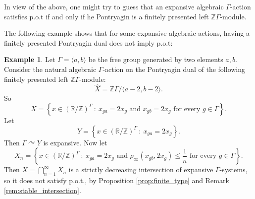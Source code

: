 \documentclass[oneside,english]{amsart}
\theoremstyle{definition}
\newtheorem{example}[thm]{Example}
\newcommand{\ZZ}{\mathbb{Z}}
\newcommand{\act}[2]{{#1} \curvearrowright {#2}}
\begin{document}
In view of the above, one might try to guess that an expansive algebraic $\Gamma$-action satisfies p.o.t if and only if he Pontryagin  is a finitely presented left $\ZZ\Gamma$-module.

The following example shows that for some expansive algebraic actions, having a  finitely presented Pontryagin dual does not imply p.o.t:
\begin{example}
Let $\Gamma= \langle a,b \rangle$ be the free group generated by two elements $a,b$. Consider the natural algebraic $\Gamma$-action  on the  Pontryagin dual of the following finitely presented  left $\ZZ\Gamma$-module:
$$\widehat{X} = \mathbb{Z}\Gamma / \langle a-2,b-2 \rangle.$$
So
$$X = \left\{ x\in (\mathbb{R}/\mathbb{Z})^\Gamma~:~  x_{ga} = 2 x_{g} \mbox { and } x_{gb} = 2 x_{g} \mbox{ for every } g \in \Gamma \right\}.$$
 Let
$$Y =  \left\{ x\in (\mathbb{R}/\mathbb{Z})^\Gamma~:~  x_{ga} = 2 x_{g}\right\}.$$
Then $\act{\Gamma}{Y}$ is expansive. Now let
$$ X_n = \left\{ x\in (\mathbb{R}/\mathbb{Z})^\Gamma~:~  x_{ga} = 2 x_{g} \mbox { and } \rho_\infty(x_{gb},2 x_{g})  \le  \frac{1}{n} \mbox{ for every } g \in \Gamma \right\}.$$
Then $X= \bigcap_{n=1}^\infty X_n$ is a strictly decreasing intersection of expansive $\Gamma$-systems, so it does not satisfy p.o.t., by Proposition \ref{prop:finite_type} and Remark \ref{rem:stable_intersection}.
\end{example}
\end{document}

